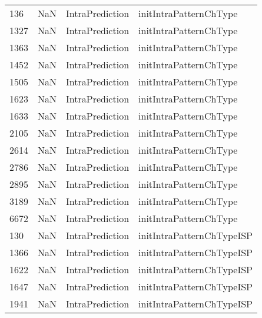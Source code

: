 \begin{tabular}{llll}
136  &                   NaN &            IntraPrediction &                    initIntraPatternChType \\
1327 &                   NaN &            IntraPrediction &                    initIntraPatternChType \\
1363 &                   NaN &            IntraPrediction &                    initIntraPatternChType \\
1452 &                   NaN &            IntraPrediction &                    initIntraPatternChType \\
1505 &                   NaN &            IntraPrediction &                    initIntraPatternChType \\
1623 &                   NaN &            IntraPrediction &                    initIntraPatternChType \\
1633 &                   NaN &            IntraPrediction &                    initIntraPatternChType \\
2105 &                   NaN &            IntraPrediction &                    initIntraPatternChType \\
2614 &                   NaN &            IntraPrediction &                    initIntraPatternChType \\
2786 &                   NaN &            IntraPrediction &                    initIntraPatternChType \\
2895 &                   NaN &            IntraPrediction &                    initIntraPatternChType \\
3189 &                   NaN &            IntraPrediction &                    initIntraPatternChType \\
6672 &                   NaN &            IntraPrediction &                    initIntraPatternChType \\
130  &                   NaN &            IntraPrediction &                 initIntraPatternChTypeISP \\
1366 &                   NaN &            IntraPrediction &                 initIntraPatternChTypeISP \\
1622 &                   NaN &            IntraPrediction &                 initIntraPatternChTypeISP \\
1647 &                   NaN &            IntraPrediction &                 initIntraPatternChTypeISP \\
1941 &                   NaN &            IntraPrediction &                 initIntraPatternChTypeISP \\

\end{tabular}
